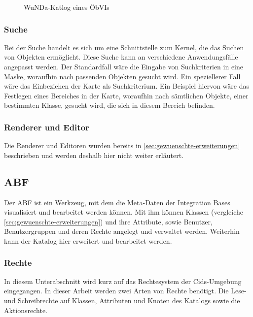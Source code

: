 \begin{figure}[htb]
	\centering
	\caption{WuNDa-Katlog eines ÖbVIs}
	\label{fig:katlog-oebvi}
\end{figure}

\subsubsection{Suche}
Bei der Suche handelt es sich um eine Schnittstelle zum Kernel, die das Suchen von Objekten ermöglicht.
Diese Suche kann an verschiedene Anwendungsfälle angepasst werden.
Der Standardfall wäre die Eingabe von Suchkriterien in eine Maske, woraufhin nach passenden Objekten gesucht wird.
Ein speziellerer Fall wäre das Einbeziehen der Karte als Suchkriterium. Ein Beispiel hiervon wäre das Festlegen eines Bereiches in der Karte, woraufhin nach sämtlichen Objekte, einer bestimmten Klasse, gesucht wird, die sich in diesem Bereich befinden.

\subsubsection{Renderer und Editor}
Die Renderer und Editoren wurden bereits in \autoref{sec:gewuenschte-erweiterungen} beschrieben und werden deshalb hier nicht weiter erläutert.

\subsection{ABF}
Der \ac{ABF} ist ein Werkzeug, mit dem die Meta-Daten der Integration Bases visualisiert und bearbeitet werden können.
Mit ihm können Klassen (vergleiche \autoref{sec:gewuenschte-erweiterungen}) und ihre Attribute, sowie Benutzer, Benutzergruppen und deren Rechte angelegt und verwaltet werden.
Weiterhin kann der Katalog hier erweitert und bearbeitet werden.

\subsubsection{Rechte}
In diesem Unterabschnitt wird kurz auf das Rechtesystem der Cids-Umgebung eingegangen. In dieser Arbeit werden zwei Arten von Rechte benötigt. Die Lese- und Schreibrechte auf Klassen, Attributen und Knoten des Katalogs sowie die Aktionsrechte.

